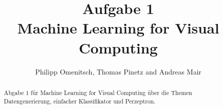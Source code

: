 \documentclass{article}
\begin{document}
\title{Aufgabe 1 \\ Machine Learning for Visual Computing}
\author{Philipp Omenitsch, Thomas Pinetz and Andreas Mair}



\maketitle
\begin{abstract}
Abgabe 1 für Machine Learning for Visual Computing über die Themen Datengenerierung, einfacher Klassifikator und Perzeptron.
\end{abstract}

\tableofcontents
\clearpage
{}







\end{document}
